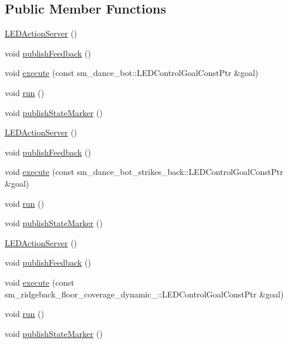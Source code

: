\subsection*{Public Member Functions}
\begin{DoxyCompactItemize}
\item 
\hyperlink{classLEDActionServer_a6978c43940438b9fd8bfcd6b443092d3}{L\+E\+D\+Action\+Server} ()
\item 
void \hyperlink{classLEDActionServer_a25c93d4e7ecdacbb4f5b090d7789aa36}{publish\+Feedback} ()
\item 
void \hyperlink{classLEDActionServer_a2d8b9dfca1912e24170ef69a5edf5e9b}{execute} (const sm\+\_\+dance\+\_\+bot\+::\+L\+E\+D\+Control\+Goal\+Const\+Ptr \&goal)
\item 
void \hyperlink{classLEDActionServer_ae8e1b2d4bf0a85eec3ffd1c7d4f08490}{run} ()
\item 
void \hyperlink{classLEDActionServer_a73bb754ac2347c50660624ad92315895}{publish\+State\+Marker} ()
\item 
\hyperlink{classLEDActionServer_a6978c43940438b9fd8bfcd6b443092d3}{L\+E\+D\+Action\+Server} ()
\item 
void \hyperlink{classLEDActionServer_a25c93d4e7ecdacbb4f5b090d7789aa36}{publish\+Feedback} ()
\item 
void \hyperlink{classLEDActionServer_aea69ee96367e9f6a82d6302f148505d6}{execute} (const sm\+\_\+dance\+\_\+bot\+\_\+strikes\+\_\+back\+::\+L\+E\+D\+Control\+Goal\+Const\+Ptr \&goal)
\item 
void \hyperlink{classLEDActionServer_ae8e1b2d4bf0a85eec3ffd1c7d4f08490}{run} ()
\item 
void \hyperlink{classLEDActionServer_a73bb754ac2347c50660624ad92315895}{publish\+State\+Marker} ()
\item 
\hyperlink{classLEDActionServer_a6978c43940438b9fd8bfcd6b443092d3}{L\+E\+D\+Action\+Server} ()
\item 
void \hyperlink{classLEDActionServer_a25c93d4e7ecdacbb4f5b090d7789aa36}{publish\+Feedback} ()
\item 
void \hyperlink{classLEDActionServer_aa7de924a8ea5f74b85d14782f4661a67}{execute} (const sm\+\_\+ridgeback\+\_\+floor\+\_\+coverage\+\_\+dynamic\+\_\+::\+L\+E\+D\+Control\+Goal\+Const\+Ptr \&goal)
\item 
void \hyperlink{classLEDActionServer_ae8e1b2d4bf0a85eec3ffd1c7d4f08490}{run} ()
\item 
void \hyperlink{classLEDActionServer_a73bb754ac2347c50660624ad92315895}{publish\+State\+Marker} ()

\end{DoxyCompactItemize}

